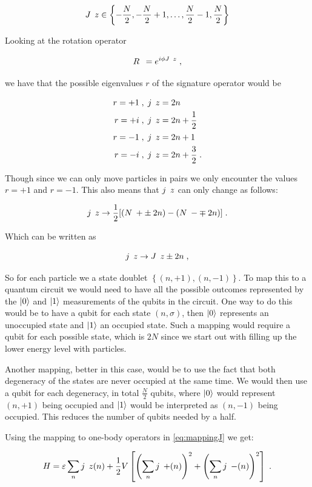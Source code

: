 \begin{equation}
    \op{J}{z} \in \left \{ -\frac{N}{2}, -\frac{N}{2}+1, \dots , \frac{N}{2} - 1, \frac{N}{2} \right \}
\end{equation}

Looking at the rotation operator

$$\op{R} = e^{i \phi \op{J}{z}} \; ,$$

we have that the possible eigenvalues $r$ of the signature operator would be

\begin{align}
    r = +1 \; &, \; \op{j}{z} = 2n \\
    r = +i \; &, \; \op{j}{z} = 2n + \frac{1}{2}\\
    r = -1 \; &, \; \op{j}{z} = 2n + 1\\
    r = -i \; &, \; \op{j}{z} = 2n + \frac{3}{2} \; .
\end{align}

Though since we can only move particles in pairs we only encounter the values $r = +1$ and $r= -1$. This also means that $\op{j}{z}$ can only change as follows:

$$\op{j}{z} \rightarrow \frac{1}{2}[(\op{N}{+}\pm 2n)-(\op{N}{-}\mp 2n)] \; .$$

Which can be written as

$$\op{j}{z} \rightarrow \op{J}{z} \pm 2n \; ,$$

So for each particle we a state doublet $ \left \{ (n, +1) , (n, -1) \right \} $. To map this to a quantum circuit we would need to have all the possible outcomes represented by the $\ket{0}$ and $\ket{1}$ measurements of the qubits in the circuit. One way to do this would be to have a qubit for each state $(n, \sigma)$, then $\ket{0}$ represents an unoccupied state and $\ket{1}$ an occupied state. Such a mapping would require a qubit for each possible state, which is $2N$ since we start out with filling up the lower energy level with particles. 

Another mapping, better in this case, would be to use the fact that both degeneracy of the states are never occupied at the same time. We would then use a qubit for each degeneracy, in total $\frac{N}{2}$ qubits, where $\ket{0}$ would represent $(n, +1)$ being occupied and $\ket{1}$ would be interpreted as $(n, -1)$ being occupied. This reduces the number of qubits needed by a half. 

Using the mapping to one-body operators in \ref{eq:mappingJ} we get:

\begin{equation}
H = \varepsilon\sum_{n}\op{j}{z}{(n)} + \frac{1}{2}V\left[\left(\sum_n\op{j}{+}{(n)}\right)^2+\left(\sum_n \op{j}{-}{(n)}\right)^2\right] \; .
\end{equation}

